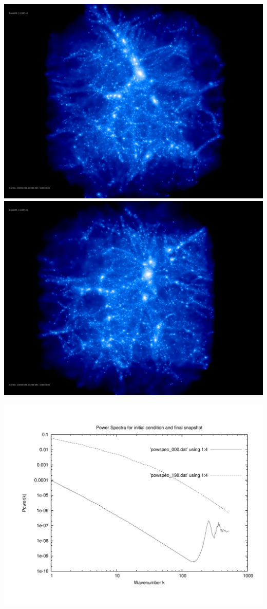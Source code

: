 \includegraphics[scale=0.1]{stages_19/rotate_00074.jpg} 
\includegraphics[scale=0.1]{stages_19/rotate_00131.jpg}

\includegraphics[scale=0.5]{stages_19/plot_powspec_stages_19}

